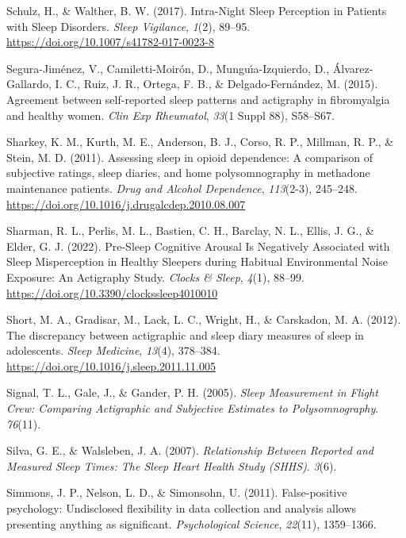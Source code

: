 \documentclass[
]{article}
\newlength{\cslhangindent}
\newenvironment{CSLReferences}[2] %
 {\begin{list}{}{%
  \setlength{\itemindent}{0pt}
  \setlength{\leftmargin}{0pt}
  \setlength{\parsep}{0pt}
  \ifodd #1
   \setlength{\leftmargin}{\cslhangindent}
   \setlength{\itemindent}{-1\cslhangindent}
  \fi
  \setlength{\itemsep}{#2\baselineskip}}}
 {\end{list}}
\begin{document}
\begin{CSLReferences}{1}{0}
Schulz, H., \& Walther, B. W. (2017). Intra-{Night} {Sleep} {Perception} in {Patients} with {Sleep} {Disorders}. \emph{Sleep Vigilance}, \emph{1}(2), 89--95. \url{https://doi.org/10.1007/s41782-017-0023-8}

Segura-Jiménez, V., Camiletti-Moirón, D., Munguı́a-Izquierdo, D., Álvarez-Gallardo, I. C., Ruiz, J. R., Ortega, F. B., \& Delgado-Fernández, M. (2015). Agreement between self-reported sleep patterns and actigraphy in fibromyalgia and healthy women. \emph{Clin Exp Rheumatol}, \emph{33}(1 Suppl 88), S58--S67.

Sharkey, K. M., Kurth, M. E., Anderson, B. J., Corso, R. P., Millman, R. P., \& Stein, M. D. (2011). Assessing sleep in opioid dependence: {A} comparison of subjective ratings, sleep diaries, and home polysomnography in methadone maintenance patients. \emph{Drug and Alcohol Dependence}, \emph{113}(2-3), 245--248. \url{https://doi.org/10.1016/j.drugalcdep.2010.08.007}

Sharman, R. L., Perlis, M. L., Bastien, C. H., Barclay, N. L., Ellis, J. G., \& Elder, G. J. (2022). Pre-{Sleep} {Cognitive} {Arousal} {Is} {Negatively} {Associated} with {Sleep} {Misperception} in {Healthy} {Sleepers} during {Habitual} {Environmental} {Noise} {Exposure}: {An} {Actigraphy} {Study}. \emph{Clocks \& Sleep}, \emph{4}(1), 88--99. \url{https://doi.org/10.3390/clockssleep4010010}

Short, M. A., Gradisar, M., Lack, L. C., Wright, H., \& Carskadon, M. A. (2012). The discrepancy between actigraphic and sleep diary measures of sleep in adolescents. \emph{Sleep Medicine}, \emph{13}(4), 378--384. \url{https://doi.org/10.1016/j.sleep.2011.11.005}

Signal, T. L., Gale, J., \& Gander, P. H. (2005). \emph{Sleep {Measurement} in {Flight} {Crew}: {Comparing} {Actigraphic} and {Subjective} {Estimates} to {Polysomnography}}. \emph{76}(11).

Silva, G. E., \& Walsleben, J. A. (2007). \emph{Relationship {Between} {Reported} and {Measured} {Sleep} {Times}: {The} {Sleep} {Heart} {Health} {Study} ({SHHS})}. \emph{3}(6).

Simmons, J. P., Nelson, L. D., \& Simonsohn, U. (2011). False-positive psychology: Undisclosed flexibility in data collection and analysis allows presenting anything as significant. \emph{Psychological Science}, \emph{22}(11), 1359--1366.


\end{CSLReferences}
\end{document}
